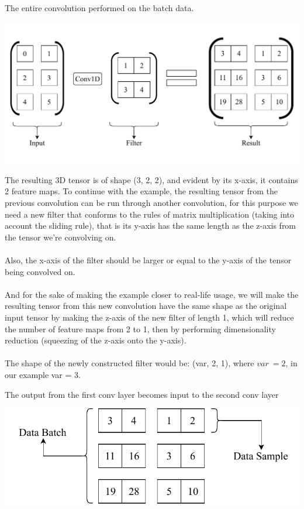 \documentclass[12pt]{article}
\newcommand\tab[1][1cm]{\hspace*{#1}}
\begin{document}
\begin{blockfigure}{ The entire convolution performed on the batch data.}
		\begin{center}
			\includegraphics[width=\textwidth]{firstConvSample_final}
		\end{center}
\end{blockfigure}
\tab The resulting 3D tensor is of shape (3, 2, 2), and evident by its x-axis, it contains 2 feature \tab maps.
\newpage
To continue with the example, the resulting tensor from the previous convolution can be run through another convolution, for this purpose we need a new filter that conforms to the rules of matrix multiplication (taking into account the sliding rule), that is its y-axis has the same length as the z-axis from the tensor we're convolving on.\\\\
Also, the x-axis of the filter should be larger or equal to the y-axis of the tensor being convolved on.\\\\
And for the sake of making the example closer to real-life usage, we will make the resulting tensor from this new convolution have the same shape as the original input tensor by making the z-axis of the new filter of length 1, which will reduce the number of feature maps from 2 to 1, then by performing dimensionality reduction (squeezing of the z-axis onto the y-axis).\\\\
The shape of the newly constructed filter would be: (var, 2, 1), where $ var \>= 2 $, in our example var = 3.
\begin{blockfigure}{The output from the first conv layer becomes input to the second conv layer}
	\begin{center}
		\includegraphics[width=\textwidth]{secondinput_final}
	\end{center}
\end{blockfigure}
\end{document}
